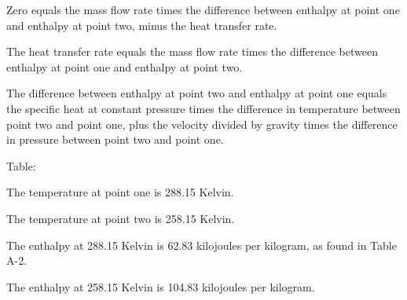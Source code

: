 Zero equals the mass flow rate times the difference between enthalpy at point one and enthalpy at point two, minus the heat transfer rate.

The heat transfer rate equals the mass flow rate times the difference between enthalpy at point one and enthalpy at point two.

The difference between enthalpy at point two and enthalpy at point one equals the specific heat at constant pressure times the difference in temperature between point two and point one, plus the velocity divided by gravity times the difference in pressure between point two and point one.

Table:

The temperature at point one is 288.15 Kelvin.

The temperature at point two is 258.15 Kelvin.

The enthalpy at 288.15 Kelvin is 62.83 kilojoules per kilogram, as found in Table A-2.

The enthalpy at 258.15 Kelvin is 104.83 kilojoules per kilogram.